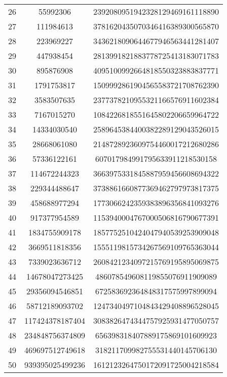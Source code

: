 \documentclass[fleqn]{article}
\begin{document}
\begin{center}
\begin{tabular}{c | c | c}
            26 & 55992306 & 2392080951942328129469161118890 \\
            27 & 111984613 & 3781620435070346416389300565870 \\
            28 & 223969227 & 3436218090644677946563441281407 \\
            29 & 447938454 & 2813991821883778725413183071783 \\
            30 & 895876908 & 4095100992664818550323883837771 \\
            31 & 1791753817 & 1509992861904565583721708762390 \\
            32 & 3583507635 & 2377378210955321166576911602384 \\
            33 & 7167015270 & 1084226818551645802206659964722 \\
            34 & 14334030540 & 2589645384400382289129043526015 \\
            35 & 28668061080 & 2148728923609754460017212680286 \\
            36 & 57336122161 & 607017984991795633911218530158 \\
            37 & 114672244323 & 3663975331845887959456608694322 \\
            38 & 229344488647 & 3738861660877369462797973817375 \\
            39 & 458688977294 & 1773066242359383896356841093276 \\
            40 & 917377954589 & 1153940004767000506816790677391 \\
            41 & 1834755909178 & 1857752510424047940539253909048 \\
            42 & 3669511818356 & 1555119815734267569109765363044 \\
            43 & 7339023636712 & 2608421234097215769195895069875 \\
            44 & 14678047273425 & 486078549608119855076911909089 \\
            45 & 29356094546851 & 672583692364848317575997899094 \\
            46 & 58712189093702 & 1247340497104843429408896528045 \\
            47 & 117424378187404 & 3083826474344757925931477050757 \\
            48 & 234848756374809 & 656398318407889175869101609923 \\
            49 & 469697512749618 & 318211709982755531440145706130 \\
            50 & 939395025499236 & 1612123264750172091725004218584 \\

\end{tabular}
\end{center}
\end{document}
